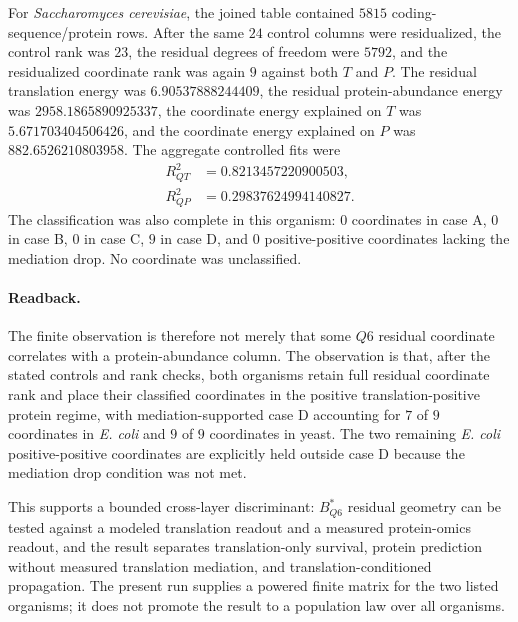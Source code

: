 For \textit{Saccharomyces cerevisiae}, the joined table contained $5815$ coding-sequence/protein rows. After the same $24$ control columns were residualized, the control rank was $23$, the residual degrees of freedom were $5792$, and the residualized coordinate rank was again $9$ against both $T$ and $P$. The residual translation energy was $6.90537888244409$, the residual protein-abundance energy was $2958.1865890925337$, the coordinate energy explained on $T$ was $5.671703404506426$, and the coordinate energy explained on $P$ was $882.6526210803958$. The aggregate controlled fits were
$$
\begin{aligned}
R^2_{QT} &= 0.8213457220900503,\\
R^2_{QP} &= 0.29837624994140827.
\end{aligned}
$$
The classification was also complete in this organism: $0$ coordinates in case A, $0$ in case B, $0$ in case C, $9$ in case D, and $0$ positive-positive coordinates lacking the mediation drop. No coordinate was unclassified.

\paragraph{Readback.}
The finite observation is therefore not merely that some $Q6$ residual coordinate correlates with a protein-abundance column. The observation is that, after the stated controls and rank checks, both organisms retain full residual coordinate rank and place their classified coordinates in the positive translation-positive protein regime, with mediation-supported case D accounting for $7$ of $9$ coordinates in \textit{E. coli} and $9$ of $9$ coordinates in yeast. The two remaining \textit{E. coli} positive-positive coordinates are explicitly held outside case D because the mediation drop condition was not met.

This supports a bounded cross-layer discriminant: $B^*_{Q6}$ residual geometry can be tested against a modeled translation readout and a measured protein-omics readout, and the result separates translation-only survival, protein prediction without measured translation mediation, and translation-conditioned propagation. The present run supplies a powered finite matrix for the two listed organisms; it does not promote the result to a population law over all organisms.

